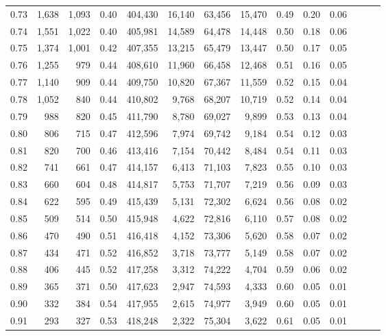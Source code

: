 \begin{tabular}{rrrrrrrrrrrrrr}
0.73 &  1,638 &  1,093 &  0.40 &  404,430 &   16,140 &  63,456 &  15,470 &  0.49 &  0.20 &      0.06 \\
0.74 &  1,551 &  1,022 &  0.40 &  405,981 &   14,589 &  64,478 &  14,448 &  0.50 &  0.18 &      0.06 \\
0.75 &  1,374 &  1,001 &  0.42 &  407,355 &   13,215 &  65,479 &  13,447 &  0.50 &  0.17 &      0.05 \\
0.76 &  1,255 &    979 &  0.44 &  408,610 &   11,960 &  66,458 &  12,468 &  0.51 &  0.16 &      0.05 \\
0.77 &  1,140 &    909 &  0.44 &  409,750 &   10,820 &  67,367 &  11,559 &  0.52 &  0.15 &      0.04 \\
0.78 &  1,052 &    840 &  0.44 &  410,802 &    9,768 &  68,207 &  10,719 &  0.52 &  0.14 &      0.04 \\
0.79 &    988 &    820 &  0.45 &  411,790 &    8,780 &  69,027 &   9,899 &  0.53 &  0.13 &      0.04 \\
0.80 &    806 &    715 &  0.47 &  412,596 &    7,974 &  69,742 &   9,184 &  0.54 &  0.12 &      0.03 \\
0.81 &    820 &    700 &  0.46 &  413,416 &    7,154 &  70,442 &   8,484 &  0.54 &  0.11 &      0.03 \\
0.82 &    741 &    661 &  0.47 &  414,157 &    6,413 &  71,103 &   7,823 &  0.55 &  0.10 &      0.03 \\
0.83 &    660 &    604 &  0.48 &  414,817 &    5,753 &  71,707 &   7,219 &  0.56 &  0.09 &      0.03 \\
0.84 &    622 &    595 &  0.49 &  415,439 &    5,131 &  72,302 &   6,624 &  0.56 &  0.08 &      0.02 \\
0.85 &    509 &    514 &  0.50 &  415,948 &    4,622 &  72,816 &   6,110 &  0.57 &  0.08 &      0.02 \\
0.86 &    470 &    490 &  0.51 &  416,418 &    4,152 &  73,306 &   5,620 &  0.58 &  0.07 &      0.02 \\
0.87 &    434 &    471 &  0.52 &  416,852 &    3,718 &  73,777 &   5,149 &  0.58 &  0.07 &      0.02 \\
0.88 &    406 &    445 &  0.52 &  417,258 &    3,312 &  74,222 &   4,704 &  0.59 &  0.06 &      0.02 \\
0.89 &    365 &    371 &  0.50 &  417,623 &    2,947 &  74,593 &   4,333 &  0.60 &  0.05 &      0.01 \\
0.90 &    332 &    384 &  0.54 &  417,955 &    2,615 &  74,977 &   3,949 &  0.60 &  0.05 &      0.01 \\
0.91 &    293 &    327 &  0.53 &  418,248 &    2,322 &  75,304 &   3,622 &  0.61 &  0.05 &      0.01 \\

\end{tabular}
